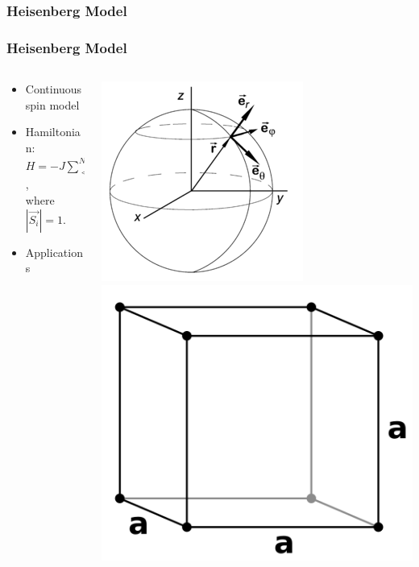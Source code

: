 \documentclass{beamer}
\begin{document}
  \subsubsection*{Heisenberg Model}
  \begin{frame}
    \frametitle{Heisenberg Model}
    	\begin{columns}[t]
    	\begin{column}[T]{5cm}
    		\begin{itemize}
    			\item Continuous spin model
    			\item Hamiltonian: \\
    						$\displaystyle H = -J\sum_{<ij>}^{N}\vec{S_i}\cdot\vec{S_j}$, \\ where $\displaystyle |\vec{S_i}| = 1$.
    			\item Applications    						
    		\end{itemize}
    	\end{column}
    	\begin{column}[T]{6cm}
    		\includegraphics[scale=1.5]{spherical_unit_vector} \includegraphics[scale=0.1]{sc} \\

\end{column}
\end{columns}
\end{frame}
\end{document}
